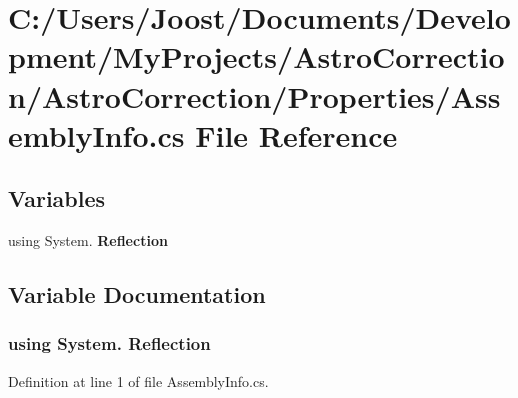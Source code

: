 \section{C:/Users/Joost/Documents/Development/MyProjects/AstroCorrection/AstroCorrection/Properties/AssemblyInfo.cs File Reference}
\label{_assembly_info_8cs}
\subsection*{Variables}
\begin{DoxyCompactItemize}
\item 
﻿using System. {\bf Reflection}
\end{DoxyCompactItemize}


\subsection{Variable Documentation}
\subsubsection[{Reflection}]{\setlength{\rightskip}{0pt plus 5cm}﻿using System. {\bf Reflection}}\label{_assembly_info_8cs_a8974f59db973551affdb297a3c5ab53a}


Definition at line 1 of file AssemblyInfo.cs.